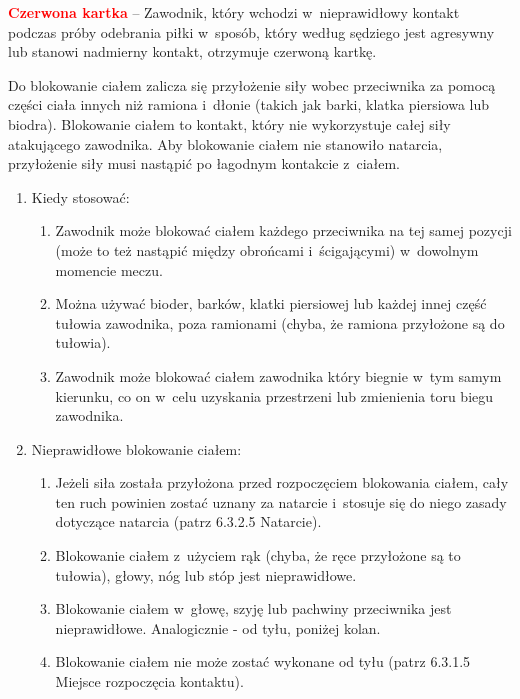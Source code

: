\documentclass[12pt,a4paper]{article}
\renewcommand{\paragraph}[1]{
  \oldparagraph{#1}%
  \leftskip2.8cm
}
\newcommand\redcard[1]{\bgroup\textcolor{red}{\textbf{#1}}}
\begin{document}
\redcard{Czerwona kartka} -- Zawodnik, który wchodzi w~nieprawidłowy kontakt
podczas próby odebrania piłki w~sposób, który według sędziego jest
agresywny lub stanowi nadmierny kontakt, otrzymuje czerwoną kartkę.

\paragraph{Blokowanie ciałem}
Do blokowanie ciałem zalicza się
przyłożenie siły wobec przeciwnika za pomocą części ciała innych niż
ramiona i~dłonie (takich jak barki, klatka piersiowa lub biodra).
Blokowanie ciałem to kontakt, który nie wykorzystuje całej siły
atakującego zawodnika. Aby blokowanie ciałem nie stanowiło natarcia,
przyłożenie siły musi nastąpić po łagodnym kontakcie z~ciałem.

\begin{enumerate}
	\item
	      Kiedy stosować:

	      \begin{enumerate}
		      \item
		            Zawodnik może blokować ciałem każdego przeciwnika na tej samej
		            pozycji (może to też nastąpić między obrońcami i~ścigającymi) w~dowolnym momencie meczu.
		      \item
		            Można używać bioder, barków, klatki piersiowej lub każdej innej
		            część tułowia zawodnika, poza ramionami (chyba, że ramiona
		            przyłożone są do tułowia).
		      \item
		            Zawodnik może blokować ciałem zawodnika który biegnie w~tym samym
		            kierunku, co on w~celu uzyskania przestrzeni lub zmienienia toru
		            biegu zawodnika.
	      \end{enumerate}
	\item
	      Nieprawidłowe blokowanie ciałem:

	      \begin{enumerate}
		      \item
		            Jeżeli siła została przyłożona przed rozpoczęciem blokowania ciałem,
		            cały ten ruch powinien zostać uznany za natarcie i~stosuje się do
		            niego zasady dotyczące natarcia (patrz 6.3.2.5 Natarcie).
		      \item
		            Blokowanie ciałem z~użyciem rąk (chyba, że ręce przyłożone są to
		            tułowia), głowy, nóg lub stóp jest nieprawidłowe.
		      \item
		            Blokowanie ciałem w~głowę, szyję lub pachwiny przeciwnika jest
		            nieprawidłowe. Analogicznie - od tyłu, poniżej kolan.
		      \item
		            Blokowanie ciałem nie może zostać wykonane od tyłu (patrz 6.3.1.5
		            Miejsce rozpoczęcia kontaktu).
	      \end{enumerate}
\end{enumerate}
\end{document}
